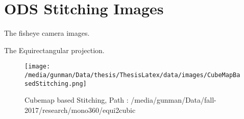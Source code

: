 \chapter{ODS Stitching Images}


The fisheye camera images.



The Equirectangular projection.




\begin{figure*}
	\begin{center}
		\texttt{[image: /media/gunman/Data/thesis/ThesisLatex/data/images/CubeMapBasedStitching.png]}
		\caption{Cubemap based Stitching, Path : /media/gunman/Data/fall-2017/research/mono360/equi2cubic}
		\label{ODS_Input_Output}
	\end{center}
	\vspace{-0.3in}
\end{figure*} 






